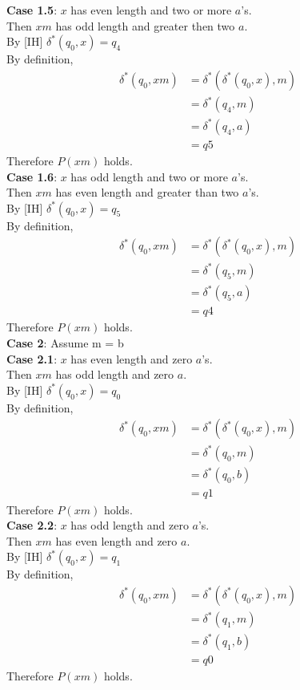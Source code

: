 \documentclass{article}
\begin{document}
\begin{enumerate}
	\textbf{Case 1.5}: $x$ has even length and two or more $a$'s. \\
	Then $xm$ has odd length and greater then two $a$.\\
	By [IH]  $\delta^*(q_0, x) = q_4$\\
	By definition,
	\begin{align*}
	\delta^*(q_0, xm) &= \delta^*(\delta^*(q_0, x), m)\\
	&= \delta^*(q_4, m)\\
	&= \delta^*(q_4, a) \\
	&= q5
	\end{align*}
	Therefore $P(xm)$ holds. \\
	
	\textbf{Case 1.6}: $x$ has odd length and two or more $a$'s. \\
	Then $xm$ has even length and greater than two $a$'s.\\
	By [IH]  $\delta^*(q_0, x) = q_5$\\
	By definition,
	\begin{align*}
	\delta^*(q_0, xm) &= \delta^*(\delta^*(q_0, x), m)\\
	&= \delta^*(q_5, m)\\
	&= \delta^*(q_5, a) \\
	&= q4
	\end{align*}
	Therefore $P(xm)$ holds. \\	
	
	
	\textbf{Case 2}: Assume m = b\\
	
	\textbf{Case 2.1}: $x$ has even length and zero $a$'s. \\
	Then $xm$ has odd length and zero $a$.\\
	By [IH]  $\delta^*(q_0, x) = q_0$\\
	By definition,
	\begin{align*}
	\delta^*(q_0, xm) &= \delta^*(\delta^*(q_0, x), m)\\
	&= \delta^*(q_0, m)\\
	&= \delta^*(q_0, b) \\
	&= q1
	\end{align*}
	Therefore $P(xm)$ holds. \\
	
	\textbf{Case 2.2}: $x$ has odd length and zero $a$'s. \\
	Then $xm$ has even length and zero $a$.\\
	By [IH]  $\delta^*(q_0, x) = q_1$\\
	By definition,
	\begin{align*}
	\delta^*(q_0, xm) &= \delta^*(\delta^*(q_0, x), m)\\
	&= \delta^*(q_1, m)\\
	&= \delta^*(q_1, b) \\
	&= q0
	\end{align*}
	Therefore $P(xm)$ holds. \\
	

\end{enumerate}
\end{document}
